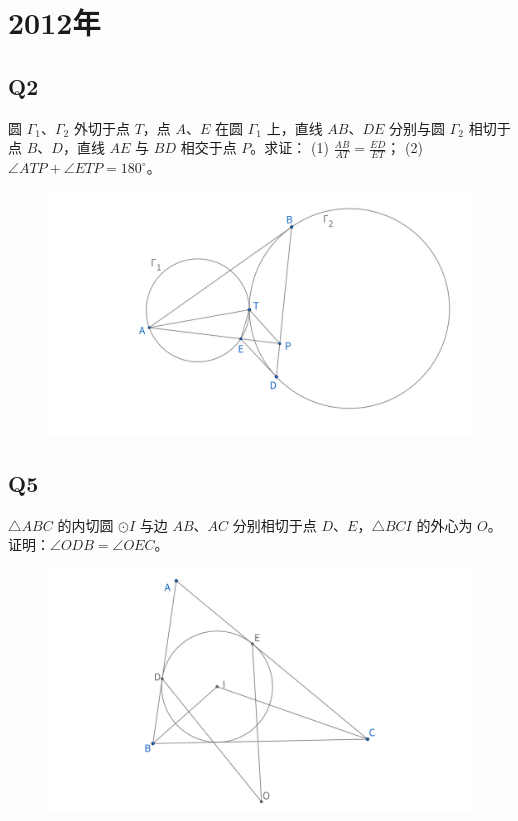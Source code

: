 \documentclass{article}
\begin{document}
\newpage 
\section{2012年}
\subsection{Q2}
圆 $\Gamma_1$、$\Gamma_2$ 外切于点 $T$，点 $A$、$E$ 在圆 $\Gamma_1$ 上，直线 $AB$、$DE$ 分别与圆 $\Gamma_2$ 相切于点 $B$、$D$，直线 $AE$ 与 $BD$ 相交于点 $P$。求证：
(1) $\frac{AB}{AT} = \frac{ED}{ET}$；
(2) $\angle ATP + \angle ETP = 180^\circ$。
\begin{figure}[htbp]
    \centering
    \includegraphics[width=0.8\linewidth]{figures/女子赛12年Q2.png}
\end{figure}


\subsection{Q5}
$\triangle ABC$ 的内切圆 $\odot I$ 与边 $AB$、$AC$ 分别相切于点 $D$、$E$，$\triangle BCI$ 的外心为 $O$。证明：$\angle ODB = \angle OEC$。
\begin{figure}[htbp]
    \centering
    \includegraphics[width=0.8\linewidth]{figures/女子赛12年Q5.png}
\end{figure}
\end{document}

